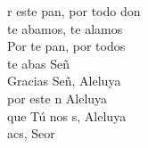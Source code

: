 \documentclass[12pt]{article}
\begin{document}
\begin{multicols*}{2}
\begin{cancion}%
	r este pan, por todo don\\
	te abamos, te alamos\\
	Por te pan, por todos\\
	te abas Señ \\
	Gracias Señ, Aleluya \\
	por este n Aleluya\\
	que Tú nos s, Aleluya\\
	acs, Seor\\
\end{cancion}%


\end{multicols*}
\end{document}
